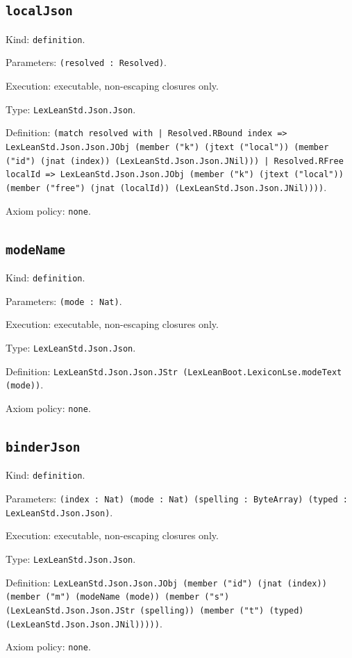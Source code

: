 \documentclass[11pt]{article}
\begin{document}
\subsection*{\texttt{localJson}}
\noindent Kind: \texttt{definition}.\par
\noindent Parameters: \texttt{(resolved : Resolved)}.\par
\noindent Execution: executable, non-escaping closures only.\par
\noindent Type: \texttt{LexLeanStd.Json.Json}.\par
\noindent Definition: \texttt{(match resolved with | Resolved.RBound index => LexLeanStd.Json.Json.JObj (member ("k") (jtext ("local")) (member ("id") (jnat (index)) (LexLeanStd.Json.Json.JNil))) | Resolved.RFree localId => LexLeanStd.Json.Json.JObj (member ("k") (jtext ("local")) (member ("free") (jnat (localId)) (LexLeanStd.Json.Json.JNil))))}.\par
\noindent Axiom policy: \texttt{none}.\par
\subsection*{\texttt{modeName}}
\noindent Kind: \texttt{definition}.\par
\noindent Parameters: \texttt{(mode : Nat)}.\par
\noindent Execution: executable, non-escaping closures only.\par
\noindent Type: \texttt{LexLeanStd.Json.Json}.\par
\noindent Definition: \texttt{LexLeanStd.Json.Json.JStr (LexLeanBoot.LexiconLse.modeText (mode))}.\par
\noindent Axiom policy: \texttt{none}.\par
\subsection*{\texttt{binderJson}}
\noindent Kind: \texttt{definition}.\par
\noindent Parameters: \texttt{(index : Nat) (mode : Nat) (spelling : ByteArray) (typed : LexLeanStd.Json.Json)}.\par
\noindent Execution: executable, non-escaping closures only.\par
\noindent Type: \texttt{LexLeanStd.Json.Json}.\par
\noindent Definition: \texttt{LexLeanStd.Json.Json.JObj (member ("id") (jnat (index)) (member ("m") (modeName (mode)) (member ("s") (LexLeanStd.Json.Json.JStr (spelling)) (member ("t") (typed) (LexLeanStd.Json.Json.JNil)))))}.\par
\noindent Axiom policy: \texttt{none}.\par
\end{document}

